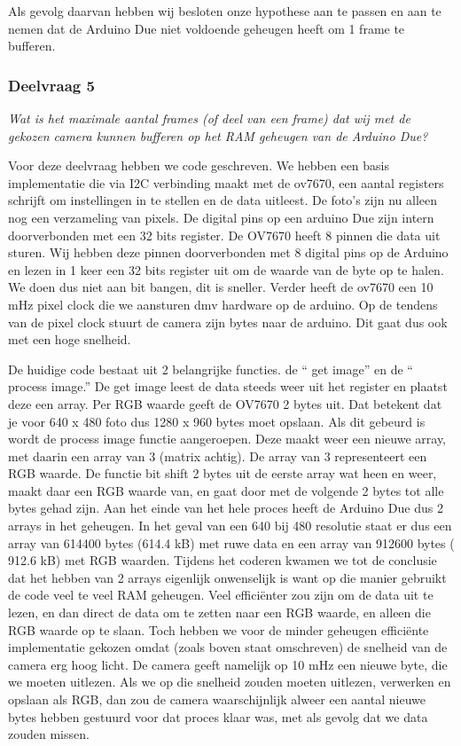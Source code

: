 \documentclass{article}
\begin{document}
Als gevolg daarvan hebben wij besloten onze hypothese aan te passen en aan te nemen dat de Arduino Due niet voldoende geheugen heeft om 1 frame te bufferen.


\subsubsection{Deelvraag 5}
\textit{Wat is het maximale aantal frames (of deel van een frame) dat wij met de gekozen camera kunnen bufferen op het RAM geheugen van de Arduino Due? }

Voor deze deelvraag hebben we code geschreven. We hebben een basis implementatie die via I2C verbinding maakt met de ov7670, een aantal registers schrijft om instellingen in te stellen en de data uitleest. De foto’s zijn nu alleen nog een verzameling van pixels. De digital pins op een arduino Due zijn intern doorverbonden met een 32 bits register. De OV7670 heeft 8 pinnen die data uit sturen. Wij hebben deze pinnen doorverbonden met 8 digital pins op de Arduino en lezen in 1 keer een 32 bits register uit om de waarde van de byte op te halen. We doen dus niet aan bit bangen, dit is sneller. Verder heeft de ov7670 een 10 mHz pixel clock die we aansturen dmv hardware op de arduino. Op de tendens van de pixel clock stuurt de camera zijn bytes naar de arduino. Dit gaat dus ook met een hoge snelheid.

De huidige code bestaat uit 2 belangrijke functies. de “ get image” en de “ process image.” De get image leest de data steeds weer uit het register en plaatst deze een array. Per RGB waarde geeft de OV7670 2 bytes uit. Dat betekent dat je voor 640 x 480 foto dus 1280 x 960 bytes moet opslaan.
Als dit gebeurd is wordt de process image functie aangeroepen. Deze maakt weer een nieuwe array, met daarin een array van 3 (matrix achtig). De array van 3 representeert een RGB waarde. De functie bit shift 2 bytes uit de eerste array wat heen en weer, maakt daar een RGB waarde van, en gaat door met de volgende 2 bytes tot alle bytes gehad zijn.
Aan het einde van het hele proces heeft de Arduino Due dus 2 arrays in het geheugen. In het geval van een 640 bij 480 resolutie staat er dus een array van 614400 bytes (614.4 kB) met ruwe data en een array van 912600 bytes ( 912.6 kB) met RGB waarden. 
Tijdens het coderen kwamen we tot de conclusie dat het hebben van 2 arrays eigenlijk onwenselijk is want op die manier gebruikt de code veel te veel RAM geheugen. Veel efficiënter zou zijn om de data uit te lezen, en dan direct de data om te zetten naar een RGB waarde, en alleen die RGB waarde op te slaan. Toch hebben we voor de minder geheugen efficiënte implementatie gekozen omdat (zoals boven staat omschreven) de snelheid van de camera erg hoog licht. De camera geeft namelijk op 10 mHz een nieuwe byte, die we moeten uitlezen. Als we op die snelheid zouden moeten uitlezen, verwerken en opslaan als RGB, dan zou de camera waarschijnlijk alweer een aantal nieuwe bytes hebben gestuurd voor dat proces klaar was, met als gevolg dat we data zouden missen. 
\end{document}
